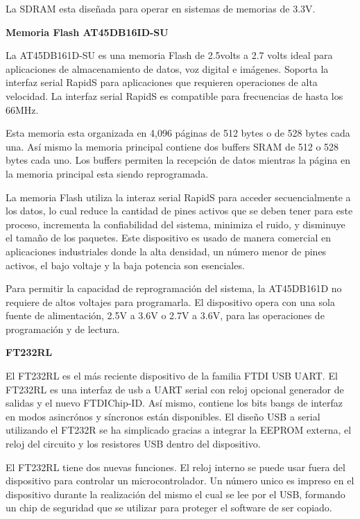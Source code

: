 La SDRAM esta diseñada para operar en sistemas de memorias de 3.3V.\medskip

\textbf{Memoria Flash AT45DB16ID-SU}\medskip

La AT45DB161D-SU es una memoria Flash de 2.5volts a 2.7 volts ideal para aplicaciones de  almacenamiento de datos, voz digital e im\'agenes. Soporta la interfaz serial RapidS para aplicaciones que requieren operaciones de alta velocidad. La interfaz serial RapidS es compatible para frecuencias de hasta los 66MHz.\medskip \cite{at45}

Esta memoria esta organizada en 4,096 p\'aginas de 512 bytes o de 528 bytes cada una. As\'i mismo la memoria principal contiene dos buffers SRAM de 512 o 528 bytes cada uno. Los buffers permiten la recepci\'on de datos mientras la p\'agina en la memoria principal esta siendo reprogramada. \medskip

La memoria Flash utiliza la interaz serial RapidS para acceder secuencialmente a los datos, lo cual reduce la cantidad de pines activos que se deben tener para este proceso, incrementa la confiabilidad del sistema, minimiza el ruido, y disminuye el tamaño de los paquetes. Este dispositivo es usado de manera comercial en aplicaciones industriales donde la alta densidad, un n\'umero menor de pines activos, el bajo voltaje y la baja potencia son esenciales.\medskip

Para permitir la capacidad de reprogramaci\'on del sistema, la  AT45DB161D no requiere de altos voltajes para programarla. El dispositivo opera con una sola fuente de alimentaci\'on, 2.5V a 3.6V o 2.7V a 3.6V, para las operaciones de programaci\'on y de lectura. \medskip

\textbf{FT232RL}\medskip

El FT232RL es el m\'as reciente dispositivo de la familia FTDI USB UART. El FT232RL es una interfaz de usb a UART serial con reloj opcional generador de salidas y el nuevo FTDIChip-ID. As\'i mismo, contiene los bits bangs de interfaz en modos asincr\'onos y s\'incronos est\'an disponibles. El diseño USB a serial utilizando el FT232R se ha simplicado gracias a integrar la EEPROM externa, el reloj del circuito y los resistores USB dentro del dispositivo. \medskip \cite{ft232}

El FT232RL tiene dos nuevas funciones. El reloj interno se puede usar fuera del dispositivo para controlar un microcontrolador. Un n\'umero unico es impreso en el dispositivo durante la realizaci\'on del mismo el cual se lee por el USB, formando un chip de seguridad que se utilizar para proteger el software de ser copiado.\medskip

